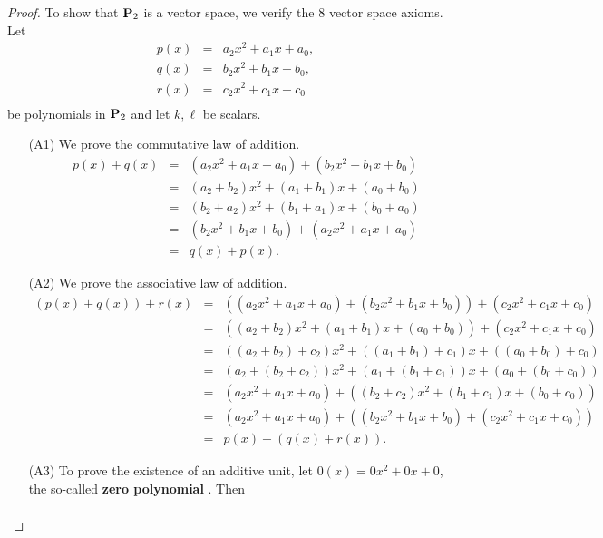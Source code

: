 \begin{proof}
  To show that $\mathbf{P}_2$ is a vector space, we verify the $8$ vector
  space axioms. Let
  \begin{eqnarray*}
    p(x) &=& a_2x^2 + a_1x + a_0, \\
    q(x) &=& b_2x^2 + b_1x + b_0, \\
    r(x) &=& c_2x^2 + c_1x + c_0 \\
  \end{eqnarray*}
  be polynomials in $\mathbf{P}_2$ and let $k,\ell$ be scalars.

  \begin{itemize}
  \item[(A1)] We prove the commutative law of addition.
    \begin{eqnarray*}
      p(x) + q(x)
      &=& (a_2x^2 + a_1x + a_0) + (b_2x^2 + b_1x + b_0) \\
      &=& (a_2 + b_2)x^2 + (a_1 + b_1)x + (a_0 + b_0) \\
      &=& (b_2 + a_2)x^2 + (b_1 + a_1)x + (b_0 + a_0) \\
      &=& (b_2x^2 + b_1x + b_0) + (a_2x^2 + a_1x + a_0) \\
      &=& q(x) + p(x).
    \end{eqnarray*}
  \item[(A2)] We prove the associative law of addition.
    \begin{eqnarray*}
      (p(x) + q(x)) + r(x)
      &=& ((a_2x^2 + a_1x + a_0) + (b_2x^2 + b_1x + b_0)) + (c_2x^2 + c_1x + c_0) \\
      &=& ((a_2 + b_2)x^2 + (a_1 + b_1)x + (a_0 + b_0)) + (c_2x^2 + c_1x + c_0) \\
      &=& ((a_2 + b_2) + c_2)x^2 + ((a_1 + b_1) + c_1)x + ((a_0 + b_0) + c_0) \\
      &=& (a_2 + (b_2 + c_2))x^2 + (a_1 + (b_1 + c_1))x + (a_0 + (b_0 + c_0)) \\
      &=& (a_2x^2 + a_1x + a_0) + ((b_2 + c_2)x^2 + (b_1 + c_1)x + (b_0 + c_0)) \\
      &=& (a_2x^2 + a_1x + a_0) + ((b_2x^2 + b_1x + b_0) + (c_2x^2 + c_1x + c_0)) \\
      &=& p(x) + (q(x) + r(x)).
    \end{eqnarray*}
  \item[(A3)] To prove the existence of an additive unit, let $0(x) =
    0x^2 + 0x + 0$, the so-called \textbf{zero polynomial}%
    . Then
    \begin{eqnarray*}

\end{eqnarray*}
\end{itemize}
\end{proof}
